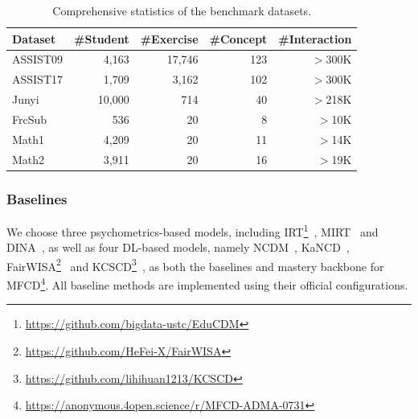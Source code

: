 \documentclass[a4paper,runningheads]{llncs}
\def\mymethod{MFCD}
\begin{document}

\begin{table}[t]
\centering
\caption{Comprehensive statistics of the benchmark datasets.}
\label{tab:datasets}
\setlength{\tabcolsep}{6pt}
\renewcommand\arraystretch{0.9}
\begin{tabular}{@{}l|rrrr@{}}
\toprule
\textbf{Dataset} & \#\textbf{Student} & \#\textbf{Exercise} & \#\textbf{Concept} & \#\textbf{Interaction} \\ \midrule
ASSIST09         & 4,163             & 17,746             & 123               & $>$300K               \\
ASSIST17         & 1,709             & 3,162              & 102               & $>$300K               \\
Junyi            & 10,000            & 714                & 40                & $>$218K                  \\
FrcSub           & 536               & 20                 & 8                 & $>$10K                \\
Math1            & 4,209               & 20                 & 11                & $>$14K                 \\
Math2            & 3,911               & 20                 & 16                & $>$19K                 \\ \bottomrule
\end{tabular}
\end{table}

\subsubsection{Baselines}
We choose three psychometrics-based models, including IRT\footnote{\url{https://github.com/bigdata-ustc/EduCDM}}~\cite{fan1998item}, MIRT\footnotemark[\value{footnote}]~\cite{reckase2009multidimensional} and DINA\footnotemark[\value{footnote}]~\cite{delatorre2009dina,bigdata2021educdm}, as well as four DL-based models, namely NCDM\footnotemark[\value{footnote}]~\cite{wang2020neural}, KaNCD\footnotemark[\value{footnote}]~\cite{wang2022neuralcd}, FairWISA\footnote{\url{https://github.com/HeFei-X/FairWISA}}~\cite{xu2025fairwisa} and KCSCD\footnote{\url{https://github.com/lihihuan1213/KCSCD}}~\cite{zhang2026knowledge}, as both the baselines and mastery backbone for \mymethod\footnote{\url{https://anonymous.4open.science/r/MFCD-ADMA-0731}}. All baseline methods are implemented using their official configurations.
\end{document}
